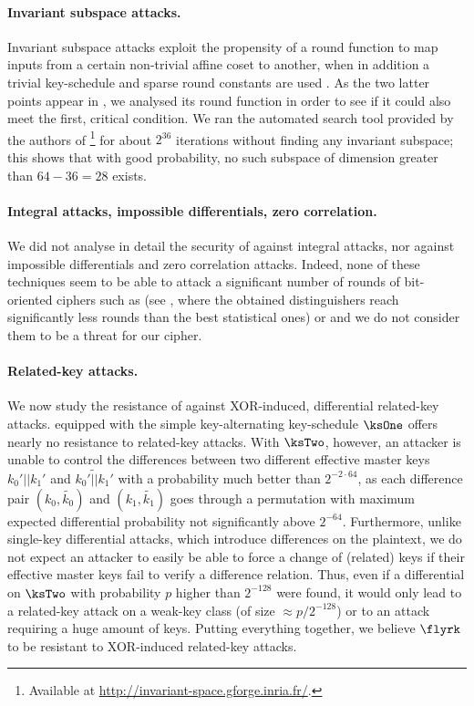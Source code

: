 \paragraph{Invariant subspace attacks.}
Invariant subspace attacks exploit the propensity of a round function to map inputs from a certain non-trivial affine coset to another, when in addition a trivial key-schedule and sparse round constants are used \cite{briceinv}.
As the two latter points appear in \fly, we analysed its round function in order to see if it could also meet the first, critical condition.
We ran the automated search tool provided by the authors of \cite{briceinv}\footnote{Available at \url{http://invariant-space.gforge.inria.fr/}.}
for about $2^{36}$ iterations without finding any invariant subspace; this shows that with good probability, no such subspace of dimension greater than $64 - 36 = 28$ exists.

\paragraph{Integral attacks, impossible differentials, zero correlation.}
We did not analyse in detail the security of \fly against integral attacks, nor against impossible differentials and zero correlation
attacks. Indeed, none of these techniques seem to be able to attack a significant number of rounds of bit-oriented ciphers such as \present
(see \eg \cite{bitintegral,presentzero,newdivision}, where the obtained distinguishers reach significantly less rounds than the best statistical ones)
or \fly and we do not consider them to be a threat
for our cipher.

\paragraph{Related-key attacks.}
We now study the resistance of \fly against XOR-induced, differential related-key attacks.
\fly equipped with the simple key-alternating key-schedule $\ksOne$ offers nearly no resistance to related-key attacks. With $\ksTwo$, however, an attacker is unable to control the
differences between two different effective master keys $k_0'||k_1'$ and $\widetilde{k_0'||k_1'}$ with a probability much better than $2^{-2\cdot64}$, as each difference pair $(k_0,\widetilde{k_0})$
and $(k_1,\widetilde{k_1})$ goes through a permutation with maximum expected differential probability not significantly above $2^{-64}$. Furthermore, unlike single-key differential attacks, which introduce differences
on the plaintext, we do not expect an attacker to easily be able to force a change of (related) keys
if their effective master keys fail to verify a difference relation. Thus, even
if a differential on $\ksTwo$ with probability $p$ higher than $2^{-128}$ were found, it would only lead to a related-key attack on a weak-key class 
	(of size $\approx p/2^{-128}$) or to an attack requiring a huge amount of keys.
Putting everything together, we believe $\flyrk$ to be resistant to XOR-induced related-key attacks.

